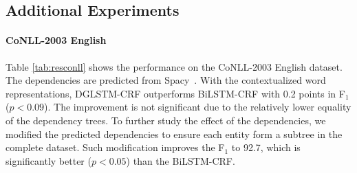 



\subsection{Additional Experiments}
%
\paragraph{CoNLL-2003 English}
Table \ref{tab:resconll} shows the performance on the CoNLL-2003 English dataset. 
The dependencies are predicted from Spacy~\cite{spacy2}. 
With the contextualized word representations, DGLSTM-CRF outperforms BiLSTM-CRF with 0.2 points in F$_1$ ($p<0.09$). 
The improvement is not significant due to the relatively lower equality of the dependency trees. 
To further study the effect of the dependencies, we modified the predicted dependencies to ensure each entity form a subtree in the complete dataset. 
Such modification improves the F$_1$ to 92.7, which is significantly better ($p<0.05$) than the BiLSTM-CRF.


